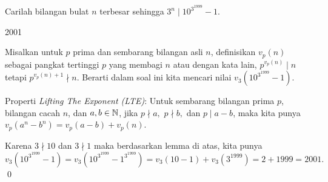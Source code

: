 \documentclass[12pt]{scrartcl}
\begin{document}
	\begin{soalbaru}
		Carilah bilangan bulat $n$ terbesar sehingga $3^n \mid 10^{3^{1999}} - 1$.
		
		\begin{jawaban}
		2001
		\end{jawaban}
		\begin{solusi}
		Misalkan untuk $p$ prima dan sembarang bilangan asli $n$, definisikan $v_p(n)$ sebagai pangkat tertinggi $p$ yang membagi $n$ atau dengan kata lain, $p^{v_p(n)} \mid n$ tetapi $p^{v_p(n)+1} \nmid n$. Berarti dalam soal ini kita mencari nilai $v_3(10^{3^{1999}} - 1)$.
		
		\begin{lemmarev}
			Properti \textit{Lifting The Exponent (LTE)}: Untuk sembarang bilangan prima $p$, bilangan cacah $n$, dan $a,b \in \mathbb N$, jika $p\nmid a,$ $ p \nmid b,$ dan $p \mid a-b$, maka kita punya $v_p(a^n-b^n) = v_p(a-b)+v_p(n)$.
		\end{lemmarev}
		
		Karena $3 \nmid 10$ dan $3 \nmid 1$ maka berdasarkan lemma di atas, kita punya\\ $v_3(10^{3^{1999}} - 1) = v_3(10^{3^{1999}} - 1^{3^{1999}})= v_3(10-1)+v_3(3^{1999})=2+1999=2001.$ \qed
		\end{solusi}
	\end{soalbaru}
	
\end{document}
